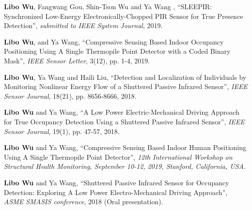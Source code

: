 

\begin{cvparagraph}

    \vspace{12pt}
    \begin{cvitems}
    \setlength{\itemsep}{2pt}
    \item{
        \textbf{Libo Wu}{, Fangwang Gou, Shin-Tson Wu and Ya Wang , ``SLEEPIR: Synchronized Low-Energy Electronically-Chopped PIR Sensor for True Presence Detection'', \textit{submitted to IEEE System Journal}, 2019.}}
        
        \item{
        \textbf{Libo Wu}{, and Ya Wang, ``Compressive Sensing Based Indoor Occupancy Positioning Using A Single Thermopile Point Detector with a Coded Binary Mask'', \textit{IEEE Sensor Letter}, 3(12), pp. 1-4, 2019.}}
  
      \item{
        \textbf{Libo Wu}{, Ya Wang and Haili Liu, ``Detection and Localization of Individuals by Monitoring Nonlinear Energy Flow of a Shuttered Passive Infrared Sensor'', \textit{IEEE Sensor Journal}, 18(21), pp. 8656-8666, 2018.}}
  
        \item{
        \textbf{Libo Wu}{ and Ya Wang, ``A Low Power Electric-Mechanical Driving Approach for True Occupancy Detection Using a Shuttered Passive Infrared Sensor'', \textit{IEEE Sensor Journal}, 19(1), pp. 47-57, 2018.}}
    \end{cvitems}
    \vspace{12pt}


\vspace{12pt}
\begin{cvitems}
    \setlength{\itemsep}{2pt}
    \item{
        \textbf{Libo Wu}{ and Ya Wang, ``Compressive Sensing Based Indoor Human Positioning Using A Single Thermopile Point Detector'', \textit{12th International Workshop on Structural Health Monitoring, September 10-12, 2019, Stanford, California, USA.}}}
      
      \item{
        \textbf{Libo Wu}{ and Ya Wang, ``Shuttered Passive Infrared Sensor for Occupancy Detection: Exploring A Low Power Electro-Mechanical Driving Approach'', \textit{ASME SMASIS conference}, 2018 (Oral presentation).}}    
      \end{cvitems}
      \vspace{8pt}

    
\end{cvparagraph}
